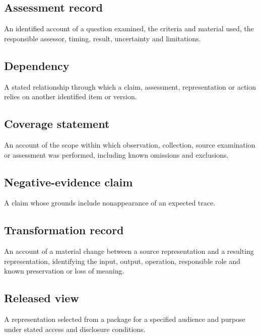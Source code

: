 \documentclass[11pt,a4paper]{article}
\begin{document}
\subsection{Assessment record}
An identified account of a question examined, the criteria and material used, the responsible assessor, timing, result, uncertainty and limitations.

\subsection{Dependency}
A stated relationship through which a claim, assessment, representation or action relies on another identified item or version.

\subsection{Coverage statement}
An account of the scope within which observation, collection, source examination or assessment was performed, including known omissions and exclusions.

\subsection{Negative-evidence claim}
A claim whose grounds include nonappearance of an expected trace.

\subsection{Transformation record}
An account of a material change between a source representation and a resulting representation, identifying the input, output, operation, responsible role and known preservation or loss of meaning.

\subsection{Released view}
A representation selected from a package for a specified audience and purpose under stated access and disclosure conditions.
\end{document}
